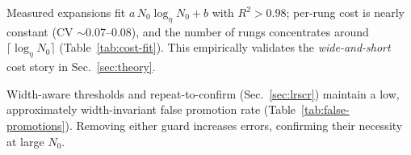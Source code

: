 \documentclass{article}
\begin{document}
Measured expansions fit $a\,N_0\log_\eta N_0{+}b$ with $R^2{>}0.98$; per-rung cost is nearly constant (CV $\sim$0.07--0.08), and the number of rungs concentrates around $\lceil\log_\eta N_0\rceil$ (Table~\ref{tab:cost-fit}).
This empirically validates the \emph{wide-and-short} cost story in Sec.~\ref{sec:theory}.

\begin{table}[t]
\centering
\caption{False promotion rate (\%, lower is better) on code/math where promotion is externally verified. \emph{Forecasted}.}
\vspace{0.3em}
\label{tab:false-promotions}
\end{table}

Width-aware thresholds and repeat-to-confirm (Sec.~\ref{sec:lrscr}) maintain a low, approximately width-invariant false promotion rate (Table~\ref{tab:false-promotions}).
Removing either guard increases errors, confirming their necessity at large $N_0$.

\begin{table}[t]
\centering
\caption{Ablations on MATH-500 (S: 8B). \emph{Forecasted} Success@1 at equal compute.}
\vspace{0.3em}
\label{tab:ablations}
\end{table}
\end{document}
